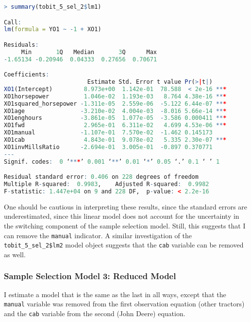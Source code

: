 \documentclass[11pt]{paper}
\begin{document}
\begin{lstlisting}[language=R]
> summary(tobit_5_sel_2$lm1)

Call:
lm(formula = YO1 ~ -1 + XO1)

Residuals:
     Min       1Q   Median       3Q      Max 
-1.65134 -0.20946  0.04333  0.27656  0.70671 

Coefficients:
                        Estimate Std. Error t value Pr(>|t|)    
XO1(Intercept)         8.973e+00  1.142e-01  78.588  < 2e-16 ***
XO1horsepower          1.046e-02  1.193e-03   8.764 4.38e-16 ***
XO1squared_horsepower -1.311e-05  2.559e-06  -5.122 6.44e-07 ***
XO1age                -3.210e-02  4.004e-03  -8.016 5.66e-14 ***
XO1enghours           -3.861e-05  1.077e-05  -3.586 0.000411 ***
XO1fwd                 2.965e-01  6.311e-02   4.699 4.53e-06 ***
XO1manual             -1.107e-01  7.570e-02  -1.462 0.145173    
XO1cab                 4.843e-01  9.078e-02   5.335 2.30e-07 ***
XO1invMillsRatio      -2.694e-01  3.005e-01  -0.897 0.370771    
---
Signif. codes:  0 ‘***’ 0.001 ‘**’ 0.01 ‘*’ 0.05 ‘.’ 0.1 ‘ ’ 1

Residual standard error: 0.406 on 228 degrees of freedom
Multiple R-squared:  0.9983,	Adjusted R-squared:  0.9982 
F-statistic: 1.447e+04 on 9 and 228 DF,  p-value: < 2.2e-16
\end{lstlisting}

One should be cautious in interpreting these results, 
since the standard errors are underestimated, 
since this linear model does not account for the uncertainty
in the switching component of the sample selection model.
Still, this suggests that I can remove the \texttt{manual} indicator.
A similar investigation of the \texttt{tobit\_5\_sel\_2\$lm2} model object
suggests that the \texttt{cab} variable can be removed as well. 

\subsubsection{Sample Selection Model 3: Reduced Model}

I estimate a model that is the same as the last in all ways, 
except that the \texttt{manual} variable was removed from the first observation equation (other tractors)
and the \texttt{cab} variable from the second (John Deere) equation. 
\end{document}
